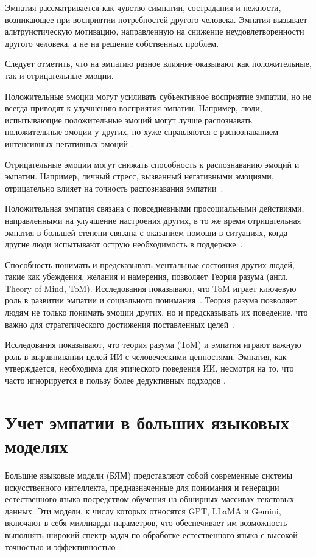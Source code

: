 Эмпатия рассматривается как чувство симпатии, сострадания и нежности, возникающее при восприятии потребностей другого человека. Эмпатия вызывает альтруистическую мотивацию, направленную на снижение неудовлетворенности другого человека, а не на решение собственных проблем.

Следует отметить, что на эмпатию разное влияние оказывают как положительные, так и отрицательные эмоции. 

Положительные эмоции могут усиливать субъективное восприятие эмпатии, но не всегда приводят к улучшению восприятия эмпатии. Например, люди, испытывающие положительные  эмоций могут лучше распознавать положительные эмоции у других, но хуже справляются с распознаванием интенсивных негативных эмоций \cite{Devlin2014}.

Отрицательные эмоции могут снижать способность к распознаванию эмоций и эмпатии. Например, личный стресс, вызванный негативными эмоциями, отрицательно влияет на точность распознавания эмпатии~\cite{Israelashvili2020}.

Положительная эмпатия связана с повседневными просоциальными действиями, направленными на улучшение настроения других, в то же время отрицательная эмпатия в большей степени связана с оказанием помощи в ситуациях, когда другие люди испытывают острую необходимость в поддержке~\cite{Andreychik2015}.


Способность понимать и предсказывать ментальные состояния других людей, такие как убеждения, желания и намерения, позволяет Теория разума (англ. Theory of Mind, ToM). Исследования показывают, что ToM играет ключевую роль в развитии эмпатии и социального понимания~\cite{Brown2017}. Теория разума позволяет людям не только понимать эмоции других, но и предсказывать их поведение, что важно для стратегического достижения поставленных целей~\cite{Artinger2014}. 

Исследования показывают, что теория разума (ToM) и эмпатия играют важную роль в выравнивании целей ИИ с человеческими ценностями. Эмпатия, как утверждается, необходима для этического поведения ИИ, несмотря на то, что часто игнорируется в пользу более дедуктивных подходов \cite{https://doi.org/10.48550/arxiv.2312.07579}.


\section{Учет эмпатии в больших языковых моделях}

Большие языковые модели (БЯМ) представляют собой современные системы искусственного интеллекта, предназначенные для понимания и генерации естественного языка посредством обучения на обширных массивах текстовых данных. Эти модели, к числу которых относятся GPT, LLaMA и Gemini, включают в себя миллиарды параметров, что обеспечивает им возможность выполнять широкий спектр задач по обработке естественного языка с высокой точностью и эффективностью~\cite{https://doi.org/10.48550/arxiv.2402.06196}.

